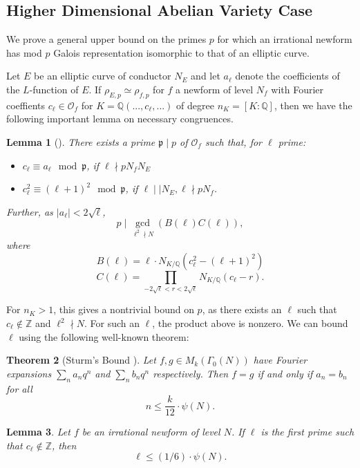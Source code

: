 \documentclass[12pt]{amsart}
\newtheorem{thm}{Theorem}[section]
\newtheorem{lem}[thm]{Lemma}
\theoremstyle{definition}
\theoremstyle{remark}
\def\O{{\mathcal O}}
\def\Q{{\mathbb Q}}
\def\Z{{\mathbb Z}}
\newcommand{\notdiv}{\nmid}
\begin{document}
\subsection{Higher Dimensional Abelian Variety Case}
We prove a general upper bound on the primes $p$ for which an irrational newform has mod $p$ Galois representation isomorphic to that of an elliptic curve.
 
Let $E$ be an elliptic curve of conductor $N_E$ and let $a_\ell$ denote the coefficients of the $L$-function of $E$.  If $\rho_{E,p} \simeq \rho_{f,p}$ for $f$ a newform of level $N_f$ with Fourier coeffients $c_\ell\in \O_f$ for $K =  \Q(...,c_\ell,...)$ of degree $n_K = [K:\mathbb{Q}]$, then we have the following important lemma on necessary congruences.

\begin{lem}[\cite{cohen07}]\label{ircong1}
There exists a prime $\mathfrak{p} \mid p$ of $\mathcal{O}_f$ such that, for $\ell$ prime:
\begin{itemize}
\item $c_\ell \equiv a_\ell \mod \mathfrak{p}$, if $\ell \nmid pN_fN_E$
\item $c_\ell^2 \equiv (\ell+1)^2 \mod \mathfrak{p}$, if $\ell \mid\mid N_E, \ell \notdiv pN_f$.
\end{itemize}
Further, as $|a_\ell| < 2\sqrt{\ell}$,
\[p \mid \gcd_{\ell^2 \nmid N}(B(\ell)C(\ell)), \] where
\[B(\ell) = \ell \cdot N_{K / \mathbb{Q}}(c_\ell^2-(\ell+1)^2) \]
\[C(\ell) = \prod_{-2\sqrt{\ell} < r < 2\sqrt{\ell}}{N_{K / \mathbb{Q}}}(c_\ell - r).\]
\end{lem}

For $n_K > 1$, this gives a nontrivial bound on $p$, as there exists an $\ell$ such that $c_\ell \notin \mathbb{Z}$ and $\ell^2 \nmid N$. For such an $\ell$, the product above is nonzero. We can bound $\ell$ using the following well-known theorem:
\begin{thm}[Sturm's Bound \cite{stein07}]\label{sturm}
Let $f,g \in M_k(\Gamma_0(N))$ have Fourier expansions $\sum_n a_nq^n$ and $\sum_n b_n q^n$ respectively.  Then $f = g$ if and only if $a_n = b_n$ for all
\[ n \leq \frac{k}{12} \cdot \psi(N). \]
\end{thm}

\begin{lem}\label{boundell}
Let $f$ be an irrational newform of level $N$.  If $\ell$ is the first prime such that $c_\ell \not\in \Z$, then
\[ \ell \leq (1/6) \cdot \psi(N) .\]
\end{lem}
\end{document}
